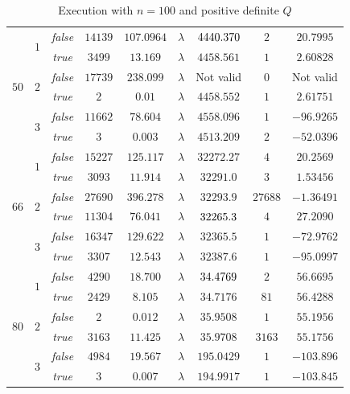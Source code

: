 \documentclass[notitlepage]{article}
\newcommand{\highlight}[1]{{\cellcolor{yellow!30} #1}}
\begin{document}
\begin{table}[H]
{\begin{tabular}{| c | c | c | c | c | c | c | c | c |}
    \multirow{6}{*}{$50$} & \multirow{2}{*}{$1$} & {\itshape false} & $14139$ & $107.0964$ & $\lambda$ & $\highlight{4440.370}$ & $2$ & $20.7995$ \\
    \cline{3-9}
     & & {\itshape true} & $3499$ & $13.169$ & $\lambda$ & $4458.561$ & $1$ & $2.60828$ \\
    \cline{2-9}
    & \multirow{2}{*}{$2$} & {\itshape false} & $17739$ & $238.099$ & $\lambda$ & Not valid & $0$ & Not valid \\ 
    \cline{3-9}
     & & {\itshape true} & $2$ & $0.01$ & $\lambda$ & $4458.552$ & $1$ & $2.61751$ \\ 
    \cline{2-9}   
     & \multirow{2}{*}{$3$} & {\itshape false} & $11662$ & $78.604$ & $\lambda$ & $4558.096$ & $1$ & $-96.9265$ \\
    \cline{3-9}
     & & {\itshape true} & $3$ & $0.003$ & $\lambda$ & $4513.209$ & $2$ & $-52.0396$ \\
    \hline

    \multirow{6}{*}{$66$} & \multirow{2}{*}{$1$} & {\itshape false} & $15227$ & $125.117$ & $\lambda$ & $32272.27$ & $4$ & $20.2569$ \\
    \cline{3-9}
     & & {\itshape true} & $3093$ & $11.914$ & $\lambda$ & $32291.0$ & $3$ & $1.53456$ \\
    \cline{2-9}
    & \multirow{2}{*}{$2$} & {\itshape false} & $27690$ & $396.278$ & $\lambda$ & $32293.9$ & $27688$ & $-1.36491$ \\ 
    \cline{3-9}
     & & {\itshape true} & $11304$ & $76.041$ & $\lambda$ & $\highlight{32265.3}$ & $4$ & $27.2090$ \\ 
    \cline{2-9}   
     & \multirow{2}{*}{$3$} & {\itshape false} & $16347$ & $129.622$ & $\lambda$ & $32365.5$ & $1$ & $-72.9762$ \\
    \cline{3-9}
     & & {\itshape true} & $3307$ & $12.543$ & $\lambda$ & $32387.6$ & $1$ & $-95.0997$ \\
    \hline

    \multirow{6}{*}{$80$} & \multirow{2}{*}{$1$} & {\itshape false} & $4290$ & $18.700$ & $\lambda$ & $\highlight{34.4769}$ & $2$ & $56.6695$ \\
    \cline{3-9}
     & & {\itshape true} & $2429$ & $8.105$ & $\lambda$ & $34.7176$ & $81$ & $56.4288$ \\
    \cline{2-9}
    & \multirow{2}{*}{$2$} & {\itshape false} & $2$ & $0.012$ & $\lambda$ & $35.9508$ & $1$ & $55.1956$ \\ 
    \cline{3-9}
     & & {\itshape true} & $3163$ & $11.425$ & $\lambda$ & $35.9708$ & $3163$ & $55.1756$ \\ 
    \cline{2-9}   
     & \multirow{2}{*}{$3$} & {\itshape false} & $4984$ & $19.567$ & $\lambda$ & $195.0429$ & $1$ & $-103.896$ \\
    \cline{3-9}
     & & {\itshape true} & $3$ & $0.007$ & $\lambda$ & $194.9917$ & $1$ & $-103.845$ \\
    \hline
  \end{tabular}%
  }
  \caption{Execution with $n=100$ and positive definite $Q$}
  \label{tab:n-100}
\end{table}
\end{document}
